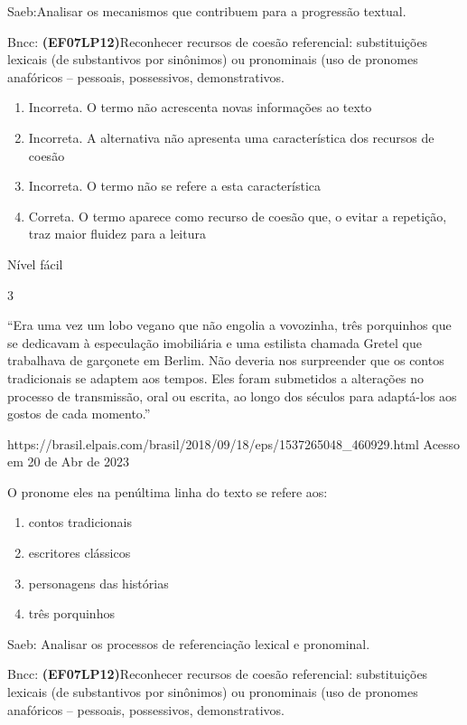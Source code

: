 {{Saeb:Analisar os mecanismos que contribuem para a progressão textual.

Bncc: \textbf{(EF07LP12)}Reconhecer recursos de coesão referencial:
substituições lexicais (de substantivos por sinônimos) ou pronominais
(uso de pronomes anafóricos -- pessoais, possessivos, demonstrativos.

\begin{enumerate}
\def\labelenumi{\arabic{enumi}.}
\item
  Incorreta. O termo não acrescenta novas informações ao texto
\item
  Incorreta. A alternativa não apresenta uma característica dos recursos
  de coesão
\item
  Incorreta. O termo não se refere a esta característica
\item
  Correta. O termo aparece como recurso de coesão que, o evitar a
  repetição, traz maior fluidez para a leitura
\end{enumerate}

Nível fácil

\num{3}

``Era uma vez um lobo vegano que não engolia a vovozinha, três
porquinhos que se dedicavam à especulação imobiliária e uma estilista
chamada Gretel que trabalhava de garçonete em Berlim. Não deveria nos
surpreender que os contos tradicionais se adaptem aos tempos. Eles foram
submetidos a alterações no processo de transmissão, oral ou escrita, ao
longo dos séculos para adaptá-los aos gostos de cada momento.''

https://brasil.elpais.com/brasil/2018/09/18/eps/1537265048\_460929.html
Acesso em 20 de Abr de 2023

O pronome eles na penúltima linha do texto se refere aos:

\begin{enumerate}
\def\labelenumi{\alph{enumi})}
\item
  contos tradicionais
\item
  escritores clássicos
\item
  personagens das histórias
\item
  três porquinhos
\end{enumerate}

Saeb: Analisar os processos de referenciação lexical e pronominal.

Bncc: \textbf{(EF07LP12)}Reconhecer recursos de coesão referencial:
substituições lexicais (de substantivos por sinônimos) ou pronominais
(uso de pronomes anafóricos -- pessoais, possessivos, demonstrativos.

}}
